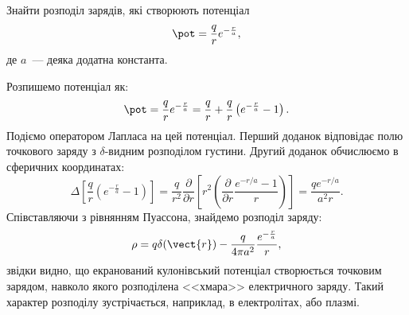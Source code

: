 \begin{problem}
Знайти розподіл зарядів, які створюють  потенціал
\[
	\pot = \frac{q}{r}e^{-\frac{r}{a}},
\]
де $a$~--- деяка додатна константа.
\begin{solution}
	Розпишемо потенціал як:
    \[
	\pot = \frac{q}{r}e^{-\frac{r}{a}} = \frac{q}{r} +  \frac{q}{r}\left(e^{-\frac{r}{a}} - 1\right) .
    \]
    Подіємо оператором Лапласа на цей потенціал. Перший доданок відповідає полю точкового заряду з  $\delta$-видним розподілом густини. Другий доданок обчислюємо в сферичних координатах:
    \[
        \Delta \left[\frac{q}{r}\left(e^{-\frac{r}{a}} - 1\right) \right] =
    \frac{q}{r^2}\frac{\partial}{\partial r}\left[ r^2\left( \frac{\partial }{\partial r}\frac{e^{-r/a} - 1}{r} \right) \right] = \frac{qe^{-r/a}}{a^2r}.
    \]
	Співставляючи з рівнянням Пуассона, знайдемо розподіл заряду:
	\[
		\rho = q\delta(\vect{r}) - \frac{q}{4\pi a^2} \frac{e^{-\frac{r}{a}}}{r},
	\]
	звідки видно, що екранований кулонівський потенціал створюється точковим зарядом, навколо якого розподілена <<хмара>> електричного заряду. Такий характер розподілу зустрічається, наприклад, в електролітах, або плазмі.
\end{solution}
\end{problem}



